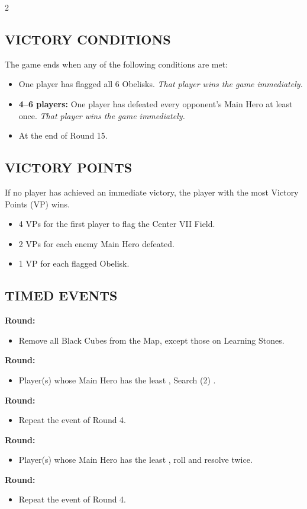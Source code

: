 \begin{multicols*}{2}
\subsection*{\MakeUppercase{Victory Conditions}}
The game ends when any of the following conditions are met:

\begin{itemize}
  \item One player has flagged all 6 Obelisks. \textit{That player wins the game immediately.}
  \item \textbf{4--6 players:} One player has defeated every opponent's Main Hero at least once. \textit{That player wins the game immediately.}
  \item At the end of Round 15.
\end{itemize}

\subsection*{\MakeUppercase{Victory Points}}
If no player has achieved an immediate victory, the player with the most Victory Points (VP) wins.

\begin{itemize}
  \item 4 VPs for the first player to flag the Center VII Field.
  \item 2 VPs for each enemy Main Hero defeated.
  \item 1 VP for each flagged Obelisk.
\end{itemize}

\subsection*{\MakeUppercase{Timed Events}}
\textbf{ Round:}
\begin{itemize}
  \item Remove all Black Cubes from the Map, except those on Learning Stones.
\end{itemize}
\textbf{ Round:}
\begin{itemize}
  \item Player(s) whose Main Hero has the least , Search (2) .
\end{itemize}
\textbf{ Round:}
\begin{itemize}
  \item Repeat the event of Round 4.
\end{itemize}
\textbf{ Round:}
\begin{itemize}
  \item Player(s) whose Main Hero has the least , roll and resolve  twice.
\end{itemize}
\textbf{ Round:}
\begin{itemize}
  \item Repeat the event of Round 4.
\end{itemize}


\end{multicols*}
